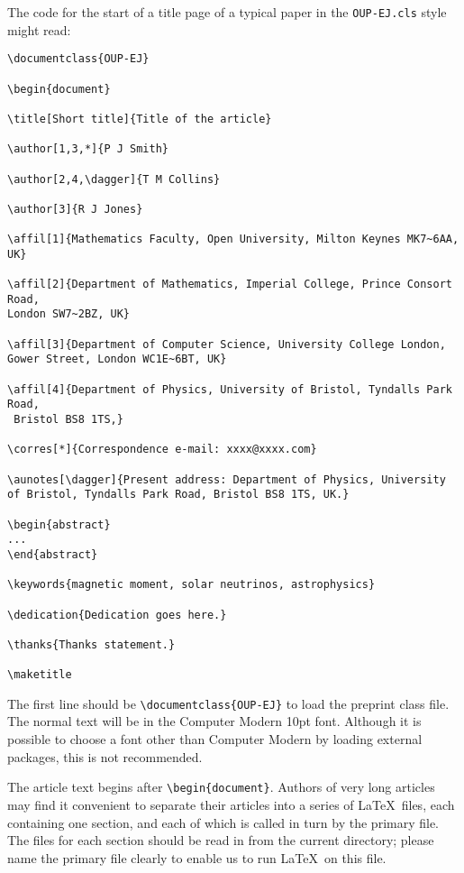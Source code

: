 \documentclass{OUP-EJ}
\begin{document}
The code for the start of a title page of a typical paper in the \verb"OUP-EJ.cls" style might read:
\small
\begin{verbatim}
\documentclass{OUP-EJ}

\begin{document}

\title[Short title]{Title of the article}

\author[1,3,*]{P J Smith}

\author[2,4,\dagger]{T M Collins}

\author[3]{R J Jones}

\affil[1]{Mathematics Faculty, Open University, Milton Keynes MK7~6AA, UK}

\affil[2]{Department of Mathematics, Imperial College, Prince Consort Road,
London SW7~2BZ, UK}

\affil[3]{Department of Computer Science, University College London,
Gower Street, London WC1E~6BT, UK}

\affil[4]{Department of Physics, University of Bristol, Tyndalls Park Road,
 Bristol BS8 1TS,}

\corres[*]{Correspondence e-mail: xxxx@xxxx.com}

\aunotes[\dagger]{Present address: Department of Physics, University
of Bristol, Tyndalls Park Road, Bristol BS8 1TS, UK.}

\begin{abstract}
...
\end{abstract}

\keywords{magnetic moment, solar neutrinos, astrophysics}

\dedication{Dedication goes here.}

\thanks{Thanks statement.}

\maketitle
\end{verbatim}
\normalsize


\noindent The first line should be
\verb"\documentclass{OUP-EJ}"  to load the preprint class
file.  The normal text will be in the Computer Modern 10pt font.
Although it is possible to choose a font other than Computer Modern by loading external packages, this is not recommended.

The article text begins after \verb"\begin{document}".
Authors of very long articles may find it convenient to separate
their articles into a series of \LaTeX\ files, each containing one section, and each of which is called
in turn by the primary file.  The files for each section should be read in from the current directory;
please name the primary file clearly to enable us to run \LaTeX\ on this file.
\end{document}
